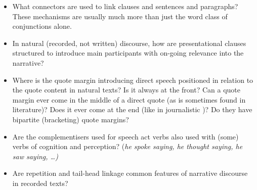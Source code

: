 \begin{itemize}
	\item	What connectors are used to link clauses
				and sentences and paragraphs? These mechanisms are usually much
				more than just the word class of conjunctions alone.

	\item	In natural (recorded,
				not written) discourse, how are presentational clauses structured
				to introduce main participants with on-going relevance into the
				narrative?
				
	\item	Where is the quote margin introducing direct speech positioned
				in relation to the quote content in natural texts? Is it always
				at the front? Can a quote margin ever come in the middle of a
				direct quote (as is sometimes found in  literature)? Does
				it ever come at the end (like in journalistic )? Do they
				have bipartite (bracketing) quote margins?

	\item	Are the complementisers used for speech act verbs also used
				with (some) verbs of cognition
				and perception? (\it{he spoke saying,
				he thought saying, he saw saying,
				{\ldots}})
				
	\item	Are repetition
				and tail-head linkage common features of narrative discourse
				in recorded texts? 
\end{itemize}